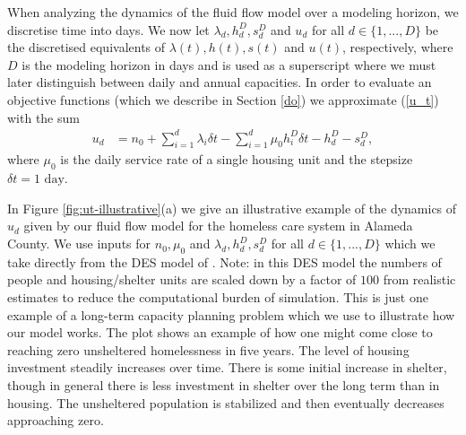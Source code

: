 \documentclass[12pt,a4paper]{article}
\begin{document}
When analyzing the dynamics of the fluid flow model over a modeling horizon, we discretise time into days. We now let $\lambda_d, h^D_d, s^D_d$ and $u_d$ for all $d \in \{1,...,D\}$ be the discretised equivalents of $\lambda(t), h(t), s(t)$ and $u(t)$, respectively, where $D$ is the modeling horizon in days and is used as a superscript where we must later distinguish between daily and annual capacities. In order to evaluate an objective functions (which we describe in Section \ref{do}) we approximate (\ref{u_t}) with the sum 
%
\begin{align} \label{u_t_discrete}
u_d & = n_0 + \sum_{i=1}^{d} \lambda_{i} \delta t - \sum_{i=1}^{d} \mu_0 h^D_{i} \delta t - h^D_d - s^D_d, 
\end{align}
%
where $\mu_0$ is the daily service rate of a single housing unit and the stepsize $\delta t = 1 \text{ day}$.

In Figure \ref{fig:ut-illustrative}(a) we give an illustrative example of the dynamics of $u_d$ given by our fluid flow model for the homeless care system in Alameda County. We use inputs for $n_0, \mu_0$ and $\lambda_d, h^D_d, s^D_d$ for all $d \in \{1,...,D\}$ which we take directly from the DES model of \cite{singham2023discrete}. Note: in this DES model the numbers of people and housing/shelter units are scaled down by a factor of $100$ from realistic estimates to reduce the computational burden of simulation. This is just one example of a long-term capacity planning problem which we use to illustrate how our model works. The plot shows an example of how one might come close to reaching zero unsheltered homelessness in five years.  The level of housing investment steadily increases over time.  There is some initial increase in shelter, though in general there is less investment in shelter over the long term than in housing.  The unsheltered population is stabilized and then eventually decreases approaching zero.
\end{document}
